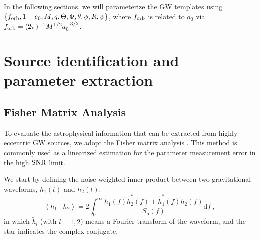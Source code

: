 \documentclass[%
 reprint,
 amsmath,amssymb,
 aps,
]{revtex4-2}
\begin{document}
In the following sections, we will parameterize the GW templates using $\left\{f_{\rm orb}, 1-e_0, M, q, \Theta, \Phi, \theta,\phi, R,\psi \right\}$, where $f_{\rm orb}$ is related to $a_0$ via $f_{\rm orb}=(2\pi)^{-1}M^{1/2}a_0^{-3/2}$.

\section{Source identification and parameter extraction}\label{sec:totalfisherandMF}

\subsection{Fisher Matrix Analysis}
\label{sec:fisherana}

To evaluate the astrophysical information that can be extracted from highly eccentric GW sources, we adopt the Fisher matrix analysis \citep{Coe+09, Cutler+94}. This method is commonly used as a linearized estimation for the parameter measurement error in the high $\rm SNR$ limit.

We start by defining the noise-weighted inner product between two gravitational waveforms, $h_{1}(t)$ and $h_{2}(t)$: 
\begin{equation}
\left\langle h_{1} \mid h_{2}\right\rangle=2 \int_{0}^{\infty} \frac{\tilde{h}_{1}(f) \tilde{h}_{2}^{*}(f)+\tilde{h}_{1}^{*}(f) \tilde{h}_{2}(f)}{S_{\mathrm{n}}(f)} \mathrm{d} f \ ,
\label{eq:innerproduct}
\end{equation}
in which $\tilde{h}_l$ (with $l=1,2$) means a Fourier transform
of the waveform, and the star indicates the complex conjugate.
\end{document}
